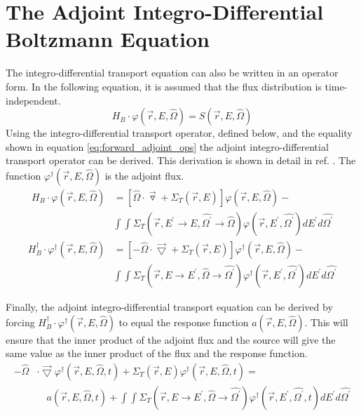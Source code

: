 \section{The Adjoint Integro-Differential Boltzmann Equation}
The integro-differential transport equation can also be written in an
operator form. In the following equation, it is assumed that the flux 
distribution is time-independent.
\begin{equation}
  H_B \cdot \varphi(\vec{r},E,\hat{\Omega}) = S(\vec{r},E,\hat{\Omega})
\end{equation}
Using the integro-differential transport operator, defined below, and the 
equality shown in equation \ref{eq:forward_adjoint_ops} the adjoint 
integro-differential transport operator can be derived. This derivation is shown
in detail in ref. \citep{lewis_computational_1993}. The function 
$\varphi^{\dagger}(\vec{r},E,\hat{\Omega})$ is the adjoint flux.
\begin{equation}
  \begin{split}
    H_B \cdot \varphi(\vec{r},E,\hat{\Omega}) &= 
    \left[ \hat{\Omega} \cdot \vec{\triangledown} +
     \Sigma_T(\vec{r},E) \right] \varphi(\vec{r},E,\hat{\Omega}) - \\
     & \int\int \Sigma_T(\vec{r},E^{'} \to E,\hat{\Omega^{'}} \to \hat{\Omega})
    \varphi(\vec{r},E^{'},\hat{\Omega^{'}}) dE^{'} d\hat{\Omega^{'}}
  \end{split}
  \label{eq:integro_diff_trans_op}
\end{equation}
\begin{equation}
  \begin{split}
    H_B^{\dagger} \cdot \varphi^{\dagger}(\vec{r},E,\hat{\Omega}) &= 
    \left[ -\hat{\Omega} \cdot \vec{\bigtriangledown} +
     \Sigma_T(\vec{r},E) \right] \varphi^{\dagger}(\vec{r},E,\hat{\Omega}) - \\
     & \int\int \Sigma_T(\vec{r},E \to E^{'},\hat{\Omega} \to \hat{\Omega^{'}})
    \varphi^{\dagger}(\vec{r},E^{'},\hat{\Omega^{'}}) dE^{'} d\hat{\Omega^{'}}
  \end{split}
  \label{eq:integro_diff_adj_trans_op}
\end{equation}

Finally, the adjoint integro-differential transport equation can be derived by
forcing $H_B^{\dagger} \cdot \varphi^{\dagger}(\vec{r},E,\hat{\Omega})$ to equal
the response function $a(\vec{r},E,\hat{\Omega})$. This will ensure that the
inner product of the adjoint flux and the source will give the same value as
the inner product of the flux and the response function.
\begin{equation}
  \begin{split}
    -\hat{\Omega} &\cdot \vec{\bigtriangledown} 
    \varphi^{\dagger}(\vec{r},E,\hat{\Omega},t)
    + \Sigma_T(\vec{r},E) \varphi^{\dagger}(\vec{r},E,\hat{\Omega},t) = \\
    & \quad a(\vec{r},E,\hat{\Omega},t) +
    \int\int \Sigma_T(\vec{r},E \to E^{'},\hat{\Omega} \to \hat{\Omega^{'}})
    \varphi^{\dagger}(\vec{r},E^{'},\hat{\Omega^{'}},t) dE^{'}d\hat{\Omega^{'}} 
  \end{split}
  \label{eq:integro_diff_adj_boltzmann_eqn}
\end{equation}

